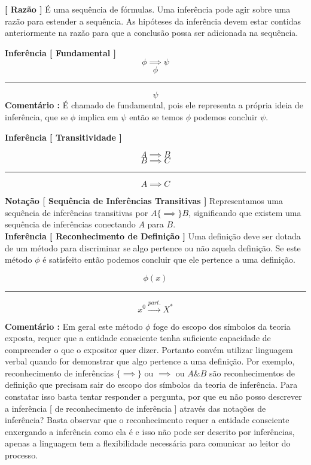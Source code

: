 \documentclass[10pt,a4paper]{report}
\begin{document}
\hspace{\baselineskip}

\textbf{[ Razão ]} É uma sequência de fórmulas. Uma inferência pode agir sobre uma razão para estender a sequência. As hipóteses da inferência devem estar contidas anteriormente na razão para que a conclusão possa ser adicionada na sequência.

\hspace{\baselineskip}

\textbf{Inferência [ Fundamental ]} 
$$ \phi \implies \psi $$
$$ \phi $$
\hrule
$$ \psi $$
\textbf{Comentário :} É chamado de fundamental, pois ele representa a própria ideia de inferência, que se $\phi$ implica em $\psi$ então se temos $\phi$ podemos concluir $\psi$.

\hspace{\baselineskip}

\textbf{Inferência [ Transitividade ]}

$$ A \implies B $$
$$ B \implies C $$
\hrule
$$ A \implies C $$

\textbf{Notação [ Sequência de Inferências Transitivas ]} Representamos uma sequência de inferências transitivas por $ A \{\implies\} B$, significando que existem uma sequência de inferências conectando $A$ para $B$.\\

\textbf{Inferência [ Reconhecimento de Definição ]} Uma definição deve ser dotada de um método para discriminar se algo pertence ou não aquela definição. Se este método $\phi$ é satisfeito então podemos concluir que ele pertence a uma definição.

$$ \phi(x) $$
\hrule
$$ x^0 \overset{part.}{\rightarrow} X^* $$

\textbf{Comentário :} Em geral este método $\phi$ foge do escopo dos símbolos da teoria exposta, requer que a entidade consciente tenha suficiente capacidade de compreender o que o expositor quer dizer. Portanto convém utilizar linguagem verbal quando for demonstrar que algo pertence a uma definição. Por exemplo, reconhecimento de inferências $\{\implies\}$ ou $\implies$ ou $A \& B$ são reconhecimentos de definição que precisam sair do escopo dos símbolos da teoria de inferência. Para constatar isso basta tentar responder a pergunta, por que eu não posso descrever a inferência [ de reconhecimento de inferência ] através das notações de inferência? Basta observar que o reconhecimento requer a entidade consciente enxergando a inferência como ela é e isso não pode ser descrito por inferências, apenas a linguagem tem a flexibilidade necessária para comunicar ao leitor do processo. \\
\end{document}
